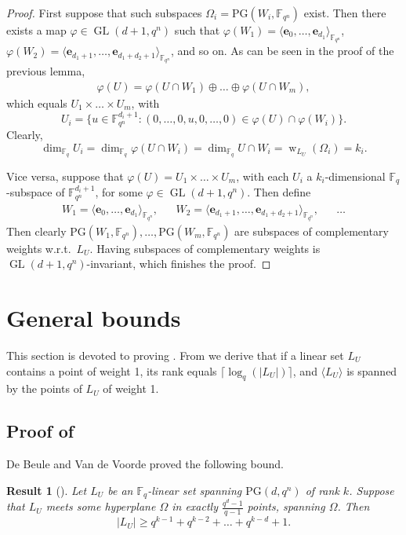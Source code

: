 \documentclass[11pt]{article}
\newtheorem{result}[theorem]{Result}
\theoremstyle{definition}
\newcommand{\fqn}{\mathbb{F}_{q^n}}
\newcommand{\fq}{{\mathbb F}_{q}}
\newcommand{\PG}{\mathrm{PG}}
\newcommand{\e}{\mathbf e}
\DeclareMathOperator{\ww}{w}
\DeclareMathOperator{\GL}{GL}
\begin{document}
\begin{proof}
First suppose that such subspaces $\Omega_i = \PG(W_i,\fqn)$ exist.
Then there exists a map $\varphi \in \GL(d+1,q^n)$ such that $\varphi(W_1) = \langle \e_0, \dots, \e_{d_1} \rangle_{\fqn}$, $\varphi(W_2) = \langle \e_{d_1 + 1}, \dots, \e_{d_1 + d_2 + 1} \rangle_{\fqn}$, and so on.
As can be seen in the proof of the previous lemma,
\begin{align*}
 \varphi(U)
 = \varphi(U \cap W_1) \oplus \ldots \oplus \varphi(U \cap W_m),
\end{align*}
which equals $U_1 \times \ldots \times U_m$, with
\[
 U_i = \{ u \in \fqn^{d_i+1} : (0, \ldots, 0, u, 0, \dots, 0) \in \varphi(U) \cap \varphi(W_i) \}. 
\]
Clearly,
\[
 \dim_{\fq} U_i = \dim_{\fq} \varphi(U \cap W_i)
 = \dim_{\fq} U \cap W_i
 = \ww_{L_U}(\Omega_i) = k_i.
\]

Vice versa, suppose that $\varphi(U) = U_1 \times \ldots \times U_m$, with each $U_i$ a $k_i$-dimensional $\fq$-subspace of $\fqn^{d_i+1}$, for some $\varphi \in \GL(d+1,q^n)$.
Then define 
\begin{align*}
 W_1 = \langle \e_0, \ldots, \e_{d_1} \rangle_{\fqn}, &&
 W_2 = \langle \e_{d_1+1}, \ldots, \e_{d_1 + d_2 + 1} \rangle_{\fqn}, &&
 \dots
\end{align*}
Then clearly $\PG(W_1, \fqn), \dots, \PG(W_m,\fqn)$ are subspaces of complementary weights w.r.t.\ $L_U$.
Having subspaces of complementary weights is $\GL(d+1,q^n)$-invariant, which finishes the proof.
\end{proof}


\section{General bounds}
 \label{sec:GeneralBounds}
This section is devoted to proving . 
From  we derive that if a linear set $L_U$ contains a point of weight 1, its rank equals $\lceil \log_q(|L_U|) \rceil$, and $\langle L_U \rangle$ is spanned by the points of $L_U$ of weight 1.

\subsection{Proof of \texorpdfstring{}{Theorem 1.4}}
 
De Beule and Van de Voorde proved the following bound.

\begin{result}[{\cite[Theorem 4.4]{debeule2019theminimumsize}}]
 Let $L_U$ be an $\fq$-linear set spanning $\PG(d,q^n)$ of rank $k$.
 Suppose that $L_U$ meets some hyperplane $\Omega$ in exactly $\frac{q^d-1}{q-1}$ points, spanning $\Omega$.
 Then
 \[
  |L_U| \geq q^{k-1} + q^{k-2} + \ldots + q^{k-d} + 1.
 \]
\end{result}
\end{document}
